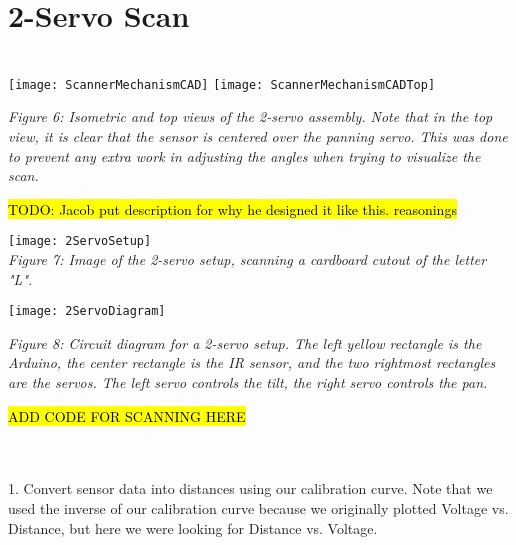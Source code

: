 \documentclass{article}
\begin{document}
\section{2-Servo Scan}
     \\
    
    \texttt{[image: ScannerMechanismCAD]}
    \texttt{[image: ScannerMechanismCADTop]}
    \begin{center}
        \textit{Figure 6: Isometric and top views of the 2-servo assembly. Note that in the top view, it is clear that the sensor is centered over the panning servo. This was done to prevent any extra work in adjusting the angles when trying to visualize the scan.}
    \end{center}

    \hl{TODO: Jacob put description for why he designed it like this. reasonings}

    \begin{center}
        \texttt{[image: 2ServoSetup]}
        \\
        \textit{Figure 7: Image of the 2-servo setup, scanning a cardboard cutout of the letter "L".}
    \end{center}

    \texttt{[image: 2ServoDiagram]}
    \begin{center}
        \textit{Figure 8: Circuit diagram for a 2-servo setup. The left yellow rectangle is the Arduino, the center rectangle is the IR sensor, and the two rightmost rectangles are the servos. The left servo controls the tilt, the right servo controls the pan.}
    \end{center}

    
    \hl{ADD CODE FOR SCANNING HERE}

     \\ \\
    1. Convert sensor data into distances using our calibration curve. Note that we used the inverse of our calibration curve because we originally plotted Voltage vs. Distance, but here we were looking for Distance vs. Voltage.
\end{document}
